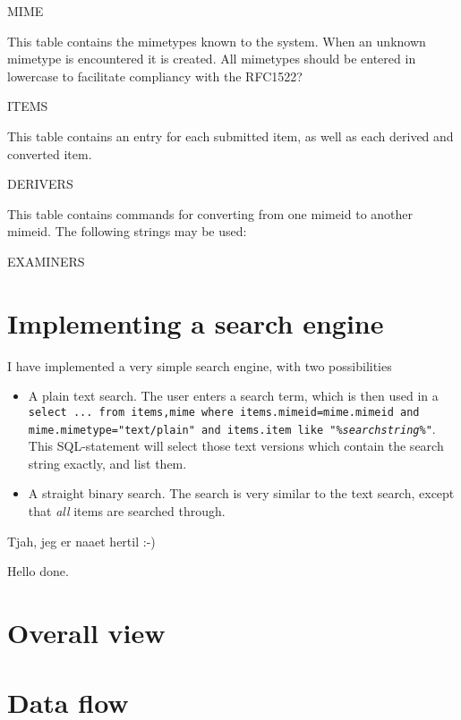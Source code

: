 MIME

This table contains the mimetypes known to the system.  When an unknown mimetype is encountered it is created.   All mimetypes should be entered in lowercase to facilitate compliancy with the RFC\textsf{1522}?

ITEMS

This table contains an entry for each submitted item, as well as each derived and converted item.  

DERIVERS

This table contains commands for converting from one mimeid to another mimeid.  The following strings may be used:


EXAMINERS



\section{Implementing a search engine}

I have implemented a very simple search engine, with two possibilities

\begin{itemize}
\item A plain text search.  The user enters a search term, which is then used in a \texttt{select ... from items,mime where items.mimeid=mime.mimeid and mime.mimetype="text/plain" and items.item like "\%\textit{searchstring}\%"}.  This SQL-statement will select those text versions which contain the search string exactly, and list them.

\item A straight binary search.  The search is very similar to the text search, except that \textit{all} items are searched through.

\end{itemize}



\textsf{Tjah, jeg er naaet hertil :-)}




Hello done.
\section{Overall view}
\label{sec:cactus-overall-view}

\section{Data flow}
\label{sec:cactus-data-flow}


